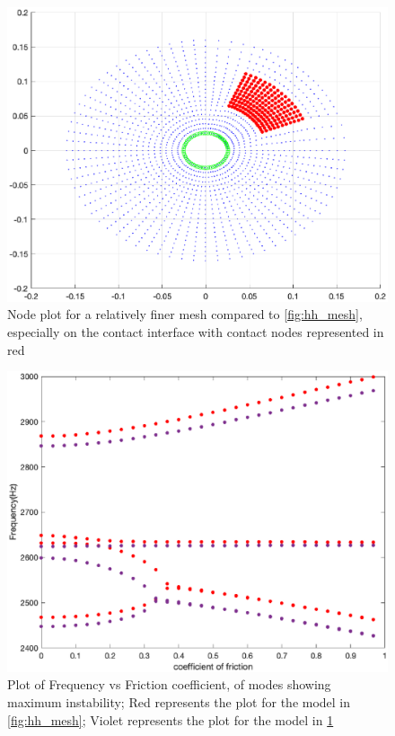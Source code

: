 \begin{figure}
    \centering
    \includegraphics[scale=0.43]{Chapter2/Pictures/Geo_pub_hhhh.eps}
    \caption{ Node plot for a relatively finer mesh compared to \ref{fig:hh_mesh}, especially on the contact interface with contact nodes represented in red}
    \label{fig:hhhh_mesh}
\end{figure}

\begin{figure}
    \centering
    \includegraphics[scale=0.43]{Chapter2/Pictures/hhvshhhh_freq.eps}
    \caption{Plot of Frequency vs Friction coefficient, of modes showing maximum instability; Red represents the plot for the model in \ref{fig:hh_mesh}; Violet represents the plot for the model in \ref{fig:hhhh_mesh}}
    \label{fig:hhhh_freq}
\end{figure}

